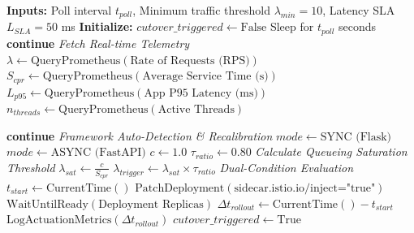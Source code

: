 \documentclass{ieeeaccess}
\begin{document}
\begin{algorithm}
	\caption{Autonomic Controller with Math-based Predictive \& SLA-Aware Dynamic Cutover}
	\label{alg:ctr}
	\begin{algorithmic}[1]
		\STATE \textbf{Inputs:} Poll interval $t_{poll}$, Minimum traffic threshold $\lambda_{min} = 10$, Latency SLA $L_{SLA} = 50$ ms
		\STATE \textbf{Initialize:} $cutover\_triggered \gets \text{False}$
		\STATE Sleep for $t_{poll}$ seconds
		\STATE \textbf{continue} 
		\ENDIF
		\vspace{2mm}
		\STATE \textit{Fetch Real-time Telemetry}
		\STATE $\lambda \gets \text{QueryPrometheus}(\text{Rate of Requests (RPS)})$
		\STATE $S_{cpr} \gets \text{QueryPrometheus}(\text{Average Service Time (s)})$
		\STATE $L_{p95} \gets \text{QueryPrometheus}(\text{App P95 Latency (ms)})$
		\STATE $n_{threads} \gets \text{QueryPrometheus}(\text{Active Threads})$
		
		\STATE \textbf{continue} 
		\ENDIF
		\vspace{2mm}
		\STATE \textit{Framework Auto-Detection \& Recalibration}
		\STATE $mode \gets \text{SYNC (Flask)}$
		\ELSE
		\STATE $mode \gets \text{ASYNC (FastAPI)}$
		\ENDIF
		\STATE $c \gets 1.0$ 
		\STATE $\tau_{ratio} \gets 0.80$ 
		\vspace{2mm}
		\STATE \textit{Calculate Queueing Saturation Threshold}
		\STATE $\lambda_{sat} \gets \frac{c}{S_{cpr}}$
		\STATE $\lambda_{trigger} \gets \lambda_{sat} \times \tau_{ratio}$
		\vspace{2mm}
		\STATE \textit{Dual-Condition Evaluation}
		\STATE $t_{start} \gets \text{CurrentTime}()$
		\STATE $\text{PatchDeployment}(\text{sidecar.istio.io/inject="true"})$
		\STATE $\text{WaitUntilReady}(\text{Deployment Replicas})$
		\STATE $\Delta t_{rollout} \gets \text{CurrentTime}() - t_{start}$
		\STATE $\text{LogActuationMetrics}(\Delta t_{rollout})$
		\STATE $cutover\_triggered \gets \text{True}$
		\ENDIF
		\ENDWHILE
	\end{algorithmic}
\end{algorithm}
\end{document}
